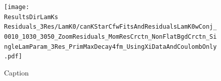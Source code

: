 \documentclass[../AnalysisNoteJBuxton.tex]{subfiles}
\begin{document}

\begin{figure}[h]
  \centering
  \texttt{[image: \\ResultsDirLamKs Residuals\_3Res/LamK0/canKStarCfwFitsAndResidualsLamK0wConj\_0010\_1030\_3050\_ZoomResiduals\_MomResCrctn\_NonFlatBgdCrctn\_SingleLamParam\_3Res\_PrimMaxDecay4fm\_UsingXiDataAndCoulombOnly.pdf]}
  \caption[Small Caption]{Caption}
  \label{fig:LamK0wConjFitsAndResiduals_3Res}
\end{figure}
\end{document}

